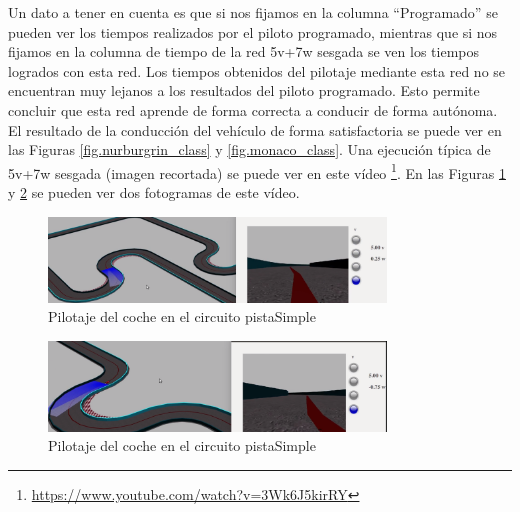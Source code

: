 Un dato a tener en cuenta es que si nos fijamos en la columna ``Programado'' se pueden ver los tiempos realizados por el piloto programado, mientras que si nos fijamos en la columna de tiempo de la red 5v+7w sesgada se ven los tiempos logrados con esta red. Los tiempos obtenidos del pilotaje mediante esta red no se encuentran muy lejanos a los resultados del piloto programado. Esto permite concluir que esta red aprende de forma correcta a conducir de forma autónoma. El resultado de la conducción del vehículo de forma satisfactoria se puede ver en las Figuras \ref{fig.nurburgrin_class} y \ref{fig.monaco_class}. Una ejecución típica de 5v+7w sesgada (imagen recortada) se puede ver en este vídeo  \footnote{\url{https://www.youtube.com/watch?v=3Wk6J5kirRY}}. En las Figuras \ref{fig.simple_frame1} y \ref{fig.simple_frame2} se pueden ver dos fotogramas de este vídeo. \\


\begin{figure}
\begin{center}
	\includegraphics[width=0.8\textwidth]{figures/Clasificacion/frame1.png}
   \caption{Pilotaje del coche en el circuito pistaSimple}
	\label{fig.simple_frame1}
\end{center}
\end{figure}

\begin{figure}
\begin{center}
	\includegraphics[width=0.8\textwidth]{figures/Clasificacion/frame2.png}
   \caption{Pilotaje del coche en el circuito pistaSimple}
	\label{fig.simple_frame2}
\end{center}
\end{figure}